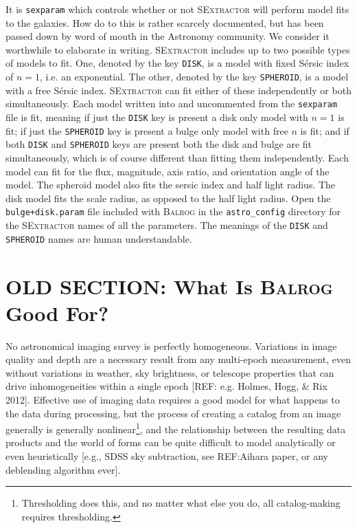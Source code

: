 \documentclass[11pt]{book}
\newcommand{\codett}[1]{\texttt{#1}}
\newcommand{\balrog}{\textsc{Balrog}}
\newcommand{\sex}{\textsc{SExtractor}}
\newcommand{\sersic}{S\'{e}rsic}
\begin{document}
It is \codett{sexparam} which controls whether or not \sex{} will perform model fits to the galaxies. 
How do to this is rather scarcely documented, but has been passed down by word of mouth in the Astronomy community. 
We consider it worthwhile to elaborate in writing.
\sex{} includes up to two possible types of models to fit.
One, denoted by the key \codett{DISK}, is a model with fixed \sersic{} index of $n=1$,
i.e. an exponential.
The other, denoted by the key \codett{SPHEROID}, is a model with a free \sersic{} index.
\sex{} can fit either of these independently or both simultaneously.
Each model written into and uncommented from the \codett{sexparam} file is fit,
meaning if just the \codett{DISK} key is present a disk only model with $n=1$ is fit;
if just the \codett{SPHEROID} key is present a bulge only model with free $n$ is fit;
and if both \codett{DISK} and \codett{SPHEROID} keys are present both the
disk and bulge are fit simultaneously, which is of course different than fitting them independently.
Each model can fit for the flux, magnitude, axis ratio, and orientation angle of the model.
The spheroid model also fits the sersic index and half light radius.
The disk model fits the scale radius, as opposed to the half light radius.
Open the \codett{bulge+disk.param} file included with \balrog{} in the \codett{astro\_config} directory
for the \sex{} names of all the parameters.
The meanings of the \codett{DISK} and \codett{SPHEROID} names are human understandable.


\section{OLD SECTION: What Is \balrog{} Good For?}
\label{sec:motivation}

No astronomical imaging survey is perfectly homogeneous. Variations in
image quality and depth are a necessary result from any multi-epoch
measurement, even without variations in weather, sky brightness, or
telescope properties that can drive inhomogeneities within a single
epoch [REF: e.g. Holmes, Hogg, \& Rix 2012]. Effective use of imaging
data requires a good model for what happens to the data during
processing, but the process of creating a catalog from an image
generally is generally nonlinear\footnote{Thresholding does this, and
  no matter what else you do, all catalog-making requires
  thresholding.}, and the relationship between the resulting
data products and the world of forms can be quite difficult to model
analytically or even heuristically [e.g., SDSS sky subtraction, see
REF:Aihara paper, or any deblending algorithm ever].
\end{document}

